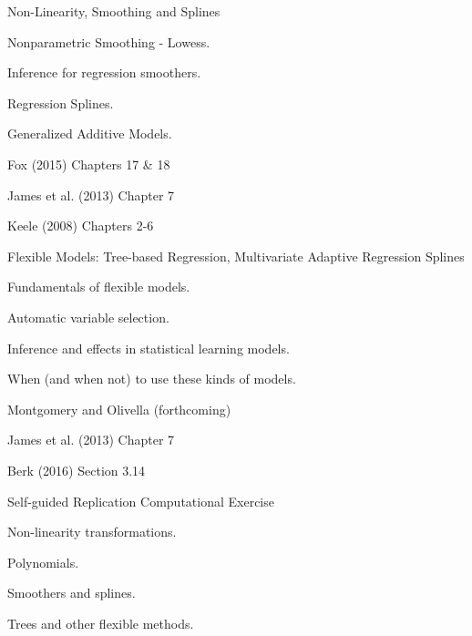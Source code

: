 \documentclass[letterpaper]{article}
\renewenvironment{itemize}{
  \begin{list}{}{
    \setlength{\leftmargin}{1.5em}
  }
}{
  \end{list}
}
\begin{document}
\begin{enumerate}
	\item Non-Linearity, Smoothing and Splines


			\begin{itemize}
				\item[$\square$] Nonparametric Smoothing - Lowess.
				\item[$\square$] Inference for regression smoothers.
				\item[$\square$] Regression Splines.
				\item[$\square$] Generalized Additive Models.
			\end{itemize}


			\begin{itemize}
				\item[$\star$] Fox (2015) Chapters 17 \& 18 
				\item[$\star$] James et al. (2013) Chapter 7 
				\item[-] Keele (2008) Chapters 2-6
			\end{itemize}



	\item Flexible Models: Tree-based Regression, Multivariate Adaptive Regression Splines



			\begin{itemize}
				\item[$\square$] Fundamentals of flexible models.
				\item[$\square$] Automatic variable selection.
				\item[$\square$] Inference and effects in statistical learning models.
				\item[$\square$] When (and when not) to use these kinds of models.
			\end{itemize}


			\begin{itemize}
				\item[$\star$] Montgomery and Olivella (forthcoming) 
				\item[$\star$] James et al. (2013) Chapter 7
				\item[$\star$] Berk (2016) Section 3.14
			\end{itemize}




	\item Self-guided Replication Computational Exercise

			\begin{itemize}
				\item[$\square$] Non-linearity transformations.
				\item[$\square$] Polynomials.
				\item[$\square$] Smoothers and splines.
				\item[$\square$] Trees and other flexible methods.
			\end{itemize}




\end{enumerate}
\end{document}
